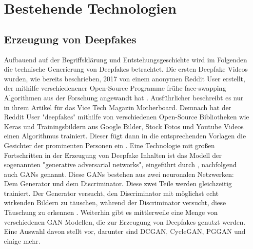 \section{Bestehende Technologien}
\subsection{Erzeugung von Deepfakes}
Aufbauend auf der Begriffsklärung und Entstehungsgeschichte wird im Folgenden die technische Generierung von Deepfakes betrachtet.
Die ersten Deepfake Videos wurden, wie bereits beschrieben, 2017 von einem anonymen Reddit User erstellt, 
der mithilfe verschiedenener Open-Source Programme frühe face-swapping Algorithmen aus der Forschung angewandt hat \cite{kernerPornDiscreditationEpistemic2021}. 
Ausführlicher beschreibt es nur \textcite{AIAssistedFakePorn2017} in ihrem Artikel für das Vice Tech Magazin Motherboard. 
Demnach hat der Reddit User "deepfakes" mithilfe von verschiedenen Open-Source Bibliotheken wie Keras und Trainingsbildern aus Google Bilder, 
Stock Fotos und Youtube Videos einen Algorithmus trainiert. Dieser fügt dann in die entsprechenden Vorlagen die Gesichter der prominenten Personen ein \cite{AIAssistedFakePorn2017}.
Eine Technologie mit großen Fortschritten in der Erzeugung von Deepfake Inhalten ist das Modell der sogenannten "generative adversarial networks", 
eingeführt durch \textcite{goodfellowGenerativeAdversarialNetworks2014}, nachfolgend auch GANs genannt. 
Diese GANs bestehen aus zwei neuronalen Netzwerken: Dem Generator und dem Discriminator. 
Diese zwei Teile werden gleichzeitig trainiert. Der Generator versucht, den Discriminator mit möglichst echt wirkenden Bildern zu täuschen, 
während der Discriminator versucht, diese Täuschung zu erkennen \cite{benaissaOverviewGANDeepFakesDetection2024}. 
Weiterhin gibt es mittlerweile eine Menge von verschiedenen GAN Modellen, die zur Erzeugung von Deepfakes genutzt werden. 
Eine Auswahl davon stellt \textcite{benaissaOverviewGANDeepFakesDetection2024}vor, darunter sind DCGAN, CycleGAN, PGGAN und einige mehr.

